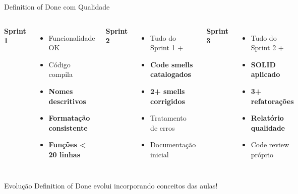 \documentclass[10pt]{beamer}
\begin{document}
\begin{frame}{Definition of Done com Qualidade}
\begin{columns}[t]
\textbf{Sprint 1}
\begin{itemize}
    \item Funcionalidade OK
    \item Código compila
    \item \textbf{Nomes descritivos}
    \item \textbf{Formatação consistente}
    \item \textbf{Funções < 20 linhas}
\end{itemize}

\textbf{Sprint 2}
\begin{itemize}
    \item Tudo do Sprint 1 +
    \item \textbf{Code smells catalogados}
    \item \textbf{2+ smells corrigidos}
    \item Tratamento de erros
    \item Documentação inicial
\end{itemize}

\textbf{Sprint 3}
\begin{itemize}
    \item Tudo do Sprint 2 +
    \item \textbf{SOLID aplicado}
    \item \textbf{3+ refatorações}
    \item \textbf{Relatório qualidade}
    \item Code review próprio
\end{itemize}
\end{columns}

\vspace{0.5cm}
\begin{alertblock}{Evolução}
Definition of Done evolui incorporando conceitos das aulas!
\end{alertblock}
\end{frame}
\end{document}
